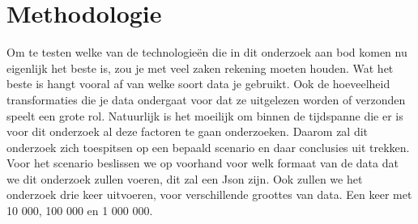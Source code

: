 
\chapter{Methodologie}
\label{ch:methodologie}




Om te testen welke van de technologieën die in dit onderzoek aan bod komen nu eigenlijk het beste is, zou je met veel zaken rekening moeten houden. Wat het beste is hangt vooral af van welke soort data je gebruikt. Ook de hoeveelheid transformaties die je data ondergaat voor dat ze uitgelezen worden of verzonden speelt een grote rol. Natuurlijk is het moeilijk om binnen de tijdspanne die er is voor dit onderzoek al deze factoren te gaan onderzoeken. Daarom zal dit onderzoek zich toespitsen op een bepaald scenario en daar conclusies uit trekken. Voor het scenario beslissen we op voorhand voor welk formaat van de data dat we dit onderzoek zullen voeren, dit zal een Json zijn. Ook zullen we het onderzoek drie keer uitvoeren, voor verschillende groottes van data. Een keer met 10 000, 100 000 en 1 000 000.  

